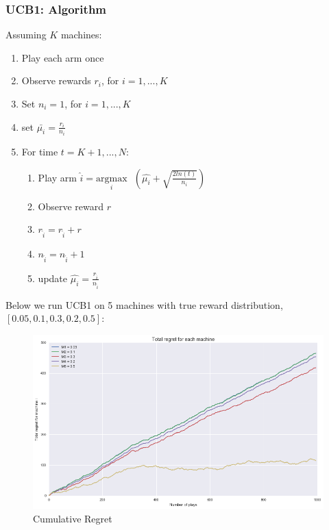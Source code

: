 \documentclass{article}
\begin{document}
\subsubsection{UCB1: Algorithm}

Assuming $K$ machines:

\begin{enumerate}
\item Play each arm once
\item Observe rewards $r_i$, for $i = 1, ..., K$
\item Set $n_i = 1$, for $i = 1, ..., K$
\item set $\bar{\mu_{i}} = \frac{r_i}{n_i}$
\item For time $t = K+1, ..., N$:
	\begin{enumerate}
		\item Play arm $\hat{i} = \underset{i}{\text{argmax}}\text{ }(\hat{\mu_{i}} + \sqrt{\frac{2 ln (t)}{n_i}})$
		\item Observe reward $r$
		\item $r_{\hat{i}} = r_{\hat{i}} + r$
		\item $n_{\hat{i}} = n_{\hat{i}} + 1$
		\item update $\hat{\mu_{i}} = \frac{r_{\hat{i}}}{n_{\hat{i}}}$
	\end{enumerate}
\end{enumerate}

Below we run UCB1 on 5 machines with true reward distribution, $[0.05,0.1,0.3,0.2,0.5]$:

\begin{figure}[H]
\centering
\includegraphics[scale=0.5]{UCB_regret.png}
\caption{Cumulative Regret}
\end{figure}
\end{document}
